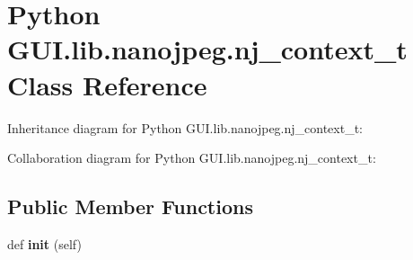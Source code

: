 \hypertarget{class_python_01_g_u_i_1_1lib_1_1nanojpeg_1_1nj__context__t}{}\section{Python G\+U\+I.\+lib.\+nanojpeg.\+nj\+\_\+context\+\_\+t Class Reference}
\label{class_python_01_g_u_i_1_1lib_1_1nanojpeg_1_1nj__context__t}


Inheritance diagram for Python G\+U\+I.\+lib.\+nanojpeg.\+nj\+\_\+context\+\_\+t\+:


Collaboration diagram for Python G\+U\+I.\+lib.\+nanojpeg.\+nj\+\_\+context\+\_\+t\+:
\subsection*{Public Member Functions}
\begin{DoxyCompactItemize}
\item 
\mbox{\label{class_python_01_g_u_i_1_1lib_1_1nanojpeg_1_1nj__context__t_a2b1e9b15071e72d12f09a9ebb22cde66}} 
def {\bfseries init} (self)
\end{DoxyCompactItemize}

